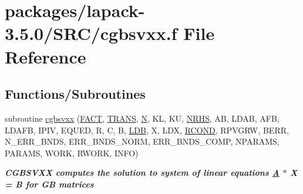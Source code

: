 \hypertarget{cgbsvxx_8f}{}\section{packages/lapack-\/3.5.0/\+S\+R\+C/cgbsvxx.f File Reference}
\label{cgbsvxx_8f}
\subsection*{Functions/\+Subroutines}
\begin{DoxyCompactItemize}
\item 
subroutine \hyperlink{group__complexGBsolve_ga366c297439ac18cfefeb91629d44f2cb}{cgbsvxx} (\hyperlink{superlu__enum__consts_8h_af00a42ecad444bbda75cde1b64bd7e72a1b6692b56d378abb85bd49063721d034}{F\+A\+C\+T}, \hyperlink{superlu__enum__consts_8h_a0c4e17b2d5cea33f9991ccc6a6678d62a1f61e3015bfe0f0c2c3fda4c5a0cdf58}{T\+R\+A\+N\+S}, \hyperlink{polmisc_8c_a0240ac851181b84ac374872dc5434ee4}{N}, K\+L, K\+U, \hyperlink{example__user_8c_aa0138da002ce2a90360df2f521eb3198}{N\+R\+H\+S}, A\+B, L\+D\+A\+B, A\+F\+B, L\+D\+A\+F\+B, I\+P\+I\+V, E\+Q\+U\+E\+D, R, C, B, \hyperlink{example__user_8c_a50e90a7104df172b5a89a06c47fcca04}{L\+D\+B}, X, L\+D\+X, \hyperlink{superlu__enum__consts_8h_af00a42ecad444bbda75cde1b64bd7e72a9b5c151728d8512307565994c89919d5}{R\+C\+O\+N\+D}, R\+P\+V\+G\+R\+W, B\+E\+R\+R, N\+\_\+\+E\+R\+R\+\_\+\+B\+N\+D\+S, E\+R\+R\+\_\+\+B\+N\+D\+S\+\_\+\+N\+O\+R\+M, E\+R\+R\+\_\+\+B\+N\+D\+S\+\_\+\+C\+O\+M\+P, N\+P\+A\+R\+A\+M\+S, P\+A\+R\+A\+M\+S, W\+O\+R\+K, R\+W\+O\+R\+K, I\+N\+F\+O)
\begin{DoxyCompactList}\small\item\em {\bfseries  C\+G\+B\+S\+V\+X\+X computes the solution to system of linear equations \hyperlink{classA}{A} $\ast$ X = B for G\+B matrices} \end{DoxyCompactList}\end{DoxyCompactItemize}

